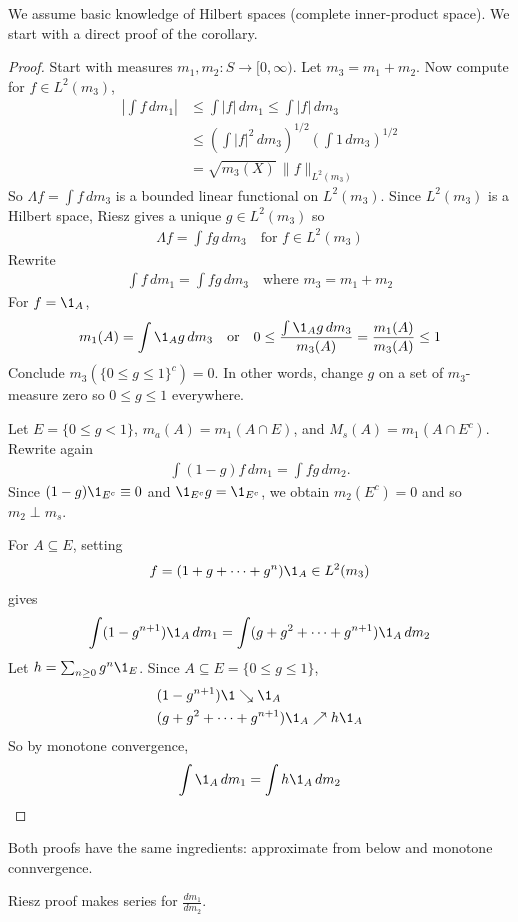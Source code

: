 We assume basic knowledge of Hilbert spaces (complete inner-product space).
We start with a direct proof of the corollary.

\begin{proof}
	Start with measures $m_1, m_2 :S \to [0,\infty)$.
	Let  $m_3 = m_1 + m_2$. Now compute for $f \in L^2 (m_3)$,
	\begin{align*}
		\left| \int f \, dm_1 \right| &\leq \int |f| \, dm_1 \leq \int |f| \, dm_3 \\
						&\leq \left( \int |f|^2 \, dm_3 \right)^{1/2} \left( \int 1 \, dm_3 \right)^{1/2}\\
						&= \sqrt{m_3 (X)} \, \|f\|_{L^{2}(m_3)}
	\end{align*}
	So $\Lambda f = \int f \, dm_3$ is a bounded linear functional on $L^2(m_3)$.
	Since $L^{2} (m_3)$ is a Hilbert space, Riesz gives a unique $g \in L^{2} (m_3)$ so
	\begin{align*}
		\Lambda f = \int f g \, dm_3 \quad \text{for } f \in L^{2}(m_3)
	\end{align*}
	Rewrite
	\begin{align*}
		\int f \, dm_1 = \int f g \, dm_3 \quad \text{where $m_3 = m_1 + m_2$}
	\end{align*}
	For $f = \1_{A}$,
	\begin{align*}
		m_1 (A) = \int \1_{A} g \, dm_3 
		\quad \text{or} \quad 0 \leq \frac{\int \1_{A} g \, dm_3}{m_3 (A)} = \frac{ m_1 (A)}{m_3 (A)} \leq 1
	\end{align*}
	Conclude $m_3 (\{0 \leq g \leq 1\}^c) = 0$. In other words, change $g$ on a set of $m_3$-measure zero so $0 \leq g \leq 1$ everywhere.
	
	Let $E = \{ 0 \leq g < 1 \}$, $m_a (A) = m_1 (A \cap E)$, and
	$M_s (A) = m_1 (A \cap E^c)$.
	Rewrite again
	\begin{align*}
		\int (1 - g) f \, dm_1 = \int fg \,dm_2.
	\end{align*}
	Since $(1 - g) \1_{E^c} \equiv 0$ and $\1_{E^c} g = \1_{E^c}$, we obtain $m_2 (E^c) = 0$
	and so $m_2 \perp m_s$.

	For $A \subseteq E$, setting
	\begin{align*}
		f = (1 + g + \cdots + g^n) \1_{A } \in L^2 (m_3)
	\end{align*} gives
	\begin{align*}
		\int ( 1 - g^{n+1}) \1_{A} \, dm_1 = \int (g + g^2 + \cdots + g^{n+1}) \1_{A} \, dm_2
	\end{align*}
	Let $h = \sum_{n \geq 0} g^{n} \1_{E}$. Since $A \subseteq E = \{ 0 \leq g \leq 1\}$,
	\begin{align*}
		&(1 - g^{n+1}) \1 \searrow \1_{A} \\
		&(g + g^2 + \cdots + g^{n+1} ) \1_{A} \nearrow h \1_{A}
	\end{align*}
	So by monotone convergence,
	\begin{align*}
		\int \1_{A} \, dm_1 = \int h \1_{A} \, dm_2
	\end{align*}
\end{proof}

\begin{remark}
	Both proofs have the same ingredients: approximate from below and monotone connvergence.

	Riesz proof makes series for $\frac{d m_1}{d m_2}$.
\end{remark}

